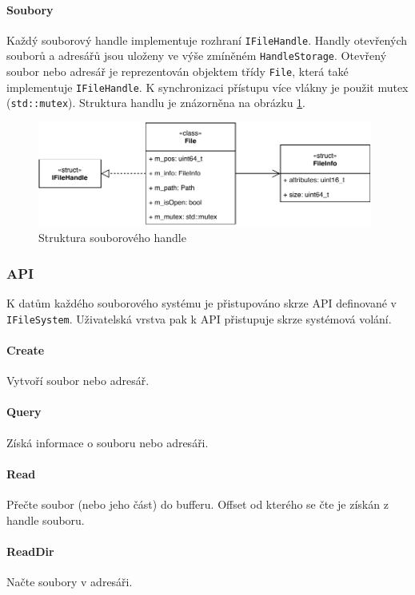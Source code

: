 \documentclass[11pt,a4paper]{scrartcl}
\begin{document}
	\paragraph{Soubory} Každý souborový handle implementuje rozhraní \verb|IFileHandle|. Handly otevřených souborů a adresářů jsou uloženy ve výše zmíněném \verb|HandleStorage|. Otevřený soubor nebo adresář je reprezentován objektem třídy \verb|File|, která také implementuje \verb|IFileHandle|. K synchronizaci přístupu více vlákny je použit mutex (\verb|std::mutex|). Struktura handlu je znázorněna na obrázku \ref{fig:file-handler}.
	
	\begin{figure}[H]
		\centering
		\includegraphics[width=11cm]{file-handler.pdf}
		\caption{Struktura souborového handle}
		\label{fig:file-handler}
	\end{figure} 
	
	\subsubsection{API}
	K datům každého souborového systému je přistupováno skrze API definované v \verb|IFileSystem|. Uživatelská vrstva pak k API přistupuje skrze systémová volání.
	
	\paragraph{Create}
	Vytvoří soubor nebo adresář.
	
	\paragraph{Query}
	Získá informace o souboru nebo adresáři.
	
	\paragraph{Read}
	Přečte soubor (nebo jeho část) do bufferu. Offset od kterého se čte je získán z handle souboru.
	
	\paragraph{ReadDir}
	Načte soubory v adresáři.
	
\end{document}
